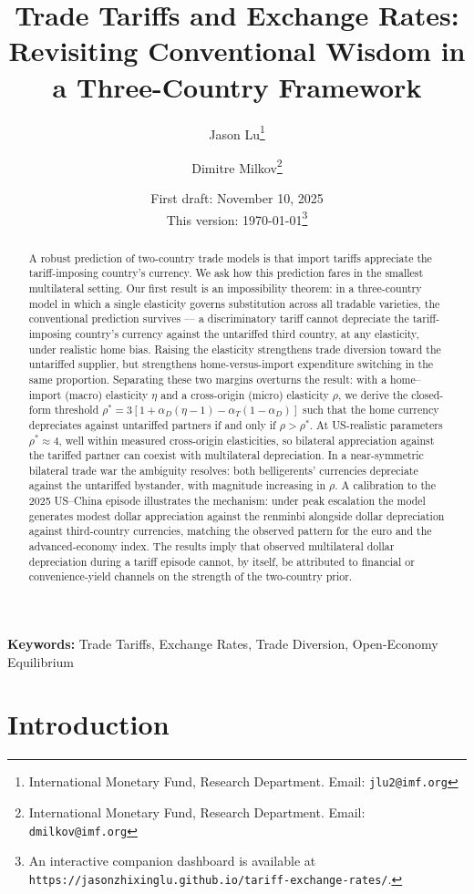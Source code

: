 \documentclass[11pt]{article}
\title{Trade Tariffs and Exchange Rates:\\
Revisiting Conventional Wisdom in a Three-Country Framework}
\author{
Jason Lu\thanks{International Monetary Fund, Research Department. Email: {\tt jlu2@imf.org}} 
\and 
Dimitre Milkov\thanks{International Monetary Fund, Research Department. Email: {\tt dmilkov@imf.org}}
}
\date{First draft: November 10, 2025 \\ This version: \today \footnote{An interactive companion dashboard is available at {\tt https://jasonzhixinglu.github.io/tariff-exchange-rates/}.}}
\theoremstyle{plain}
\theoremstyle{remark}
\numberwithin{lemma}{section}
\numberwithin{proposition}{section}
\numberwithin{corollary}{section}
\newcommand{\rev}[1]{{\color{RevBlue}#1}}
\begin{document}
\maketitle

\begin{abstract}
\rev{A robust prediction of two-country trade models is that import tariffs appreciate the tariff-imposing country's currency. We ask how this prediction fares in the smallest multilateral setting. Our first result is an impossibility theorem: in a three-country model in which a single elasticity governs substitution across all tradable varieties, the conventional prediction survives --- a discriminatory tariff cannot depreciate the tariff-imposing country's currency against the untariffed third country, at any elasticity, under realistic home bias. Raising the elasticity strengthens trade diversion toward the untariffed supplier, but strengthens home-versus-import expenditure switching in the same proportion. Separating these two margins overturns the result: with a home--import (macro) elasticity $\eta$ and a cross-origin (micro) elasticity $\rho$, we derive the closed-form threshold $\rho^* = 3\left[1+\alpha_D(\eta-1)-\alpha_T(1-\alpha_D)\right]$ such that the home currency depreciates against untariffed partners if and only if $\rho > \rho^*$. At US-realistic parameters $\rho^* \approx 4$, well within measured cross-origin elasticities, so bilateral appreciation against the tariffed partner can coexist with multilateral depreciation. In a near-symmetric bilateral trade war the ambiguity resolves: both belligerents' currencies depreciate against the untariffed bystander, with magnitude increasing in $\rho$. A calibration to the 2025 US--China episode illustrates the mechanism: under peak escalation the model generates modest dollar appreciation against the renminbi alongside dollar depreciation against third-country currencies, matching the observed pattern for the euro and the advanced-economy index. The results imply that observed multilateral dollar depreciation during a tariff episode cannot, by itself, be attributed to financial or convenience-yield channels on the strength of the two-country prior.}
\end{abstract}

\noindent\textbf{Keywords:} Trade Tariffs, Exchange Rates, Trade Diversion, Open-Economy Equilibrium

\newpage
\section{Introduction}
\end{document}
